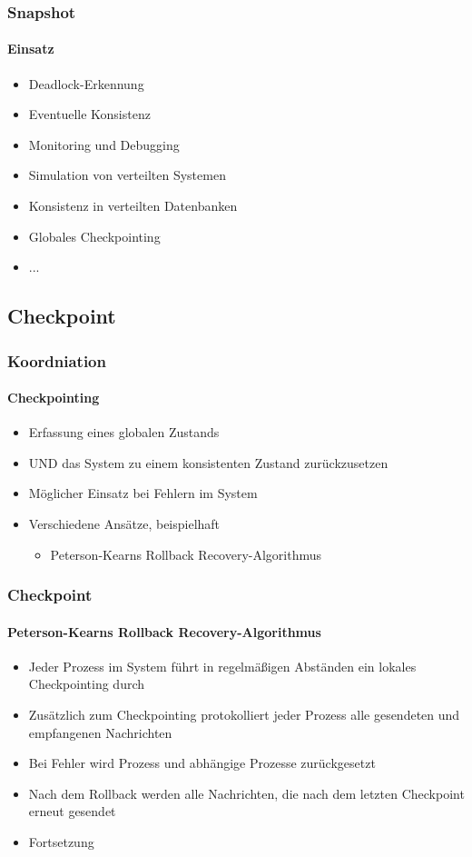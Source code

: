 \begin{frame}
  \frametitle{Snapshot}
  \framesubtitle{Einsatz}
  \begin{itemize}
    \item Deadlock-Erkennung
    \item Eventuelle Konsistenz
    \item Monitoring und Debugging
    \item Simulation von verteilten Systemen
    \item Konsistenz in verteilten Datenbanken
    \item Globales Checkpointing
    \item ...
  \end{itemize}
\end{frame}

\subsection{Checkpoint}
\begin{frame}
  \frametitle{Koordniation}
  \framesubtitle{Checkpointing}
  \begin{itemize}
    \item Erfassung eines globalen Zustands 
    \item UND das System zu einem konsistenten Zustand zurückzusetzen
    \item Möglicher Einsatz bei Fehlern im System
    \item Verschiedene Ansätze, beispielhaft
     \begin{itemize}
      \item Peterson-Kearns Rollback Recovery-Algorithmus
     \end{itemize}
  \end{itemize}
\end{frame}


\begin{frame}
  \frametitle{Checkpoint}
  \framesubtitle{Peterson-Kearns Rollback Recovery-Algorithmus}
  \begin{itemize}
    \item Jeder Prozess im System führt in regelmäßigen Abständen ein lokales Checkpointing durch
    \item Zusätzlich zum Checkpointing protokolliert jeder Prozess alle gesendeten und empfangenen Nachrichten
    \item Bei Fehler wird Prozess und abhängige Prozesse zurückgesetzt
    \item Nach dem Rollback werden alle Nachrichten, die nach dem letzten Checkpoint erneut gesendet
    \item Fortsetzung 
  \end{itemize}
\end{frame}


